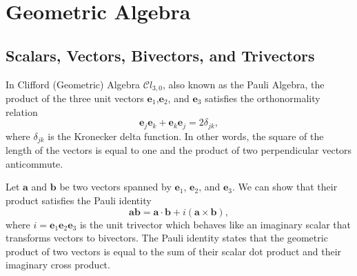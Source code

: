 \documentclass[twocolumn,showpacs,preprintnumbers,amsmath,amssymb]{revtex4}
\begin{document}
\section{Geometric Algebra}


\subsection{Scalars, Vectors, Bivectors, and Trivectors}

In Clifford (Geometric) Algebra $\mathcal Cl_{3,0}$, also known as the Pauli Algebra, the product of the three unit vectors $\mathbf{e}_1$,$\mathbf{e}_2$, and $\mathbf{e}_3$ satisfies the orthonormality relation \cite{vold, hestenesoersted, geomaloptics}
\begin{equation} 
\label{eq:orthonormality}
\mathbf e_j \mathbf e_k + \mathbf e_k \mathbf e_j = 2 \delta_{jk},
\end{equation}
where $\delta_{jk}$ is the Kronecker delta function. 
In other words, the square of the length of the vectors is equal to one and the product of two perpendicular vectors anticommute.

Let $\mathbf a$ and $\mathbf b$ be two vectors spanned by $\mathbf e_1$, $\mathbf e_2$, and $\mathbf e_3$.  We can show that their product satisfies the Pauli identity\cite{baylis1,lounesto}
\begin{equation}
\mathbf a\mathbf b = \mathbf a\cdot\mathbf b + i(\mathbf a\times\mathbf b),
\end{equation}
where 
$i=\mathbf e_1\mathbf e_2\mathbf e_3$
is the unit trivector which behaves like an imaginary scalar that transforms vectors to bivectors. 
The Pauli identity states that the geometric product of two vectors is equal to the sum of their scalar dot product and their imaginary cross product.
\end{document}
